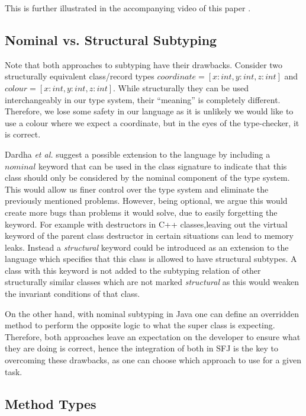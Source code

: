 \documentclass[runningheads]{llncs}
\begin{document}
This is further illustrated in the accompanying video of this paper \cite{UD20}.

\subsection{Nominal vs. Structural Subtyping}

Note that both approaches to subtyping have their drawbacks.
Consider two structurally equivalent class/record types $coordinate = [x:int, y:int, z:int]$ and $colour = [x:int, y:int, z:int]$.
While structurally they can be used interchangeably in our type system, their ``meaning'' is completely different.
Therefore, we lose some safety in our language as it is unlikely we would like to use a colour where we expect a coordinate, but in the eyes of the type-checker, it is correct.

Dardha \emph{et al.}\cite{Dardha2017} suggest a possible extension to the language by including a $nominal$ keyword that can be used in the class signature to indicate that this class should only be considered by the nominal component of the type system.
This would allow us finer control over the type system and eliminate the previously mentioned problems.
However, being optional, we argue this would create more bugs than problems it would solve, due to easily forgetting the keyword.
For example with destructors in C++ classes,leaving out the virtual keyword of the parent class destructor in certain situations can lead to memory leaks.
Instead a \emph{structural} keyword could be introduced as an extension to the language which specifies that this class is allowed to have structural subtypes.
A class with this keyword is not added to the subtyping relation of other structurally similar classes which are not marked \emph{structural} as this would weaken the invariant conditions of that class.

On the other hand, with nominal subtyping in Java one can define an overridden method to perform the opposite logic to what the super class is expecting.
Therefore, both approaches leave an expectation on the developer to ensure what they are doing is correct, hence the integration of both in SFJ is the key to overcoming these drawbacks, as one can choose which approach to use for a given task.

\subsection{Method Types}
\end{document}

